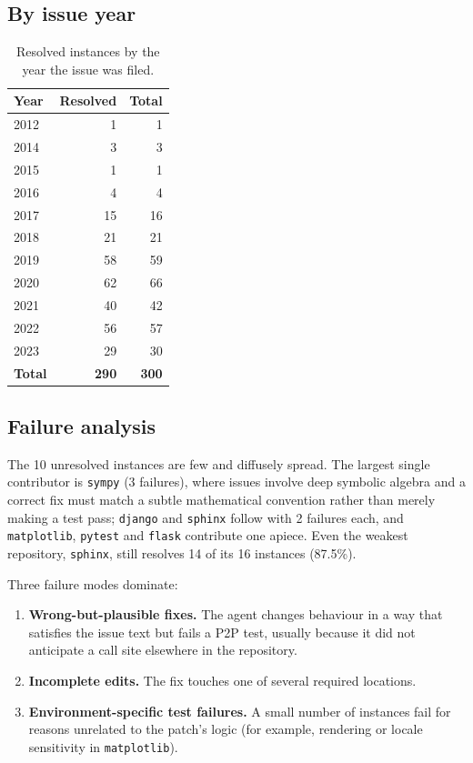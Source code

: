 \documentclass[11pt,a4paper]{article}
\begin{document}
\subsection{By issue year}

\begin{table}[H]
\centering
\caption{Resolved instances by the year the issue was filed.}
\label{tab:byyear}
\begin{tabular}{@{}lrr@{}}
\toprule
Year & Resolved & Total \\
\midrule
2012 & 1 & 1 \\
2014 & 3 & 3 \\
2015 & 1 & 1 \\
2016 & 4 & 4 \\
2017 & 15 & 16 \\
2018 & 21 & 21 \\
2019 & 58 & 59 \\
2020 & 62 & 66 \\
2021 & 40 & 42 \\
2022 & 56 & 57 \\
2023 & 29 & 30 \\
\midrule
\textbf{Total} & \textbf{290} & \textbf{300} \\
\bottomrule
\end{tabular}
\end{table}

\subsection{Failure analysis}

The 10 unresolved instances are few and diffusely spread. The largest single
contributor is \texttt{sympy} (3 failures), where issues involve deep symbolic algebra
and a correct fix must match a subtle mathematical convention rather than merely making a
test pass; \texttt{django} and \texttt{sphinx} follow with 2 failures each, and
\texttt{matplotlib}, \texttt{pytest} and \texttt{flask} contribute one apiece. Even the
weakest repository, \texttt{sphinx}, still resolves 14 of its 16 instances (87.5\%).

Three failure modes dominate:

\begin{enumerate}[leftmargin=1.4em]
  \item \textbf{Wrong-but-plausible fixes.} The agent changes behaviour in a way that
  satisfies the issue text but fails a P2P test, usually because it did not anticipate a
  call site elsewhere in the repository.
  \item \textbf{Incomplete edits.} The fix touches one of several required locations.
  \item \textbf{Environment-specific test failures.} A small number of instances fail
  for reasons unrelated to the patch's logic (for example, rendering or locale
  sensitivity in \texttt{matplotlib}).
\end{enumerate}
\end{document}
